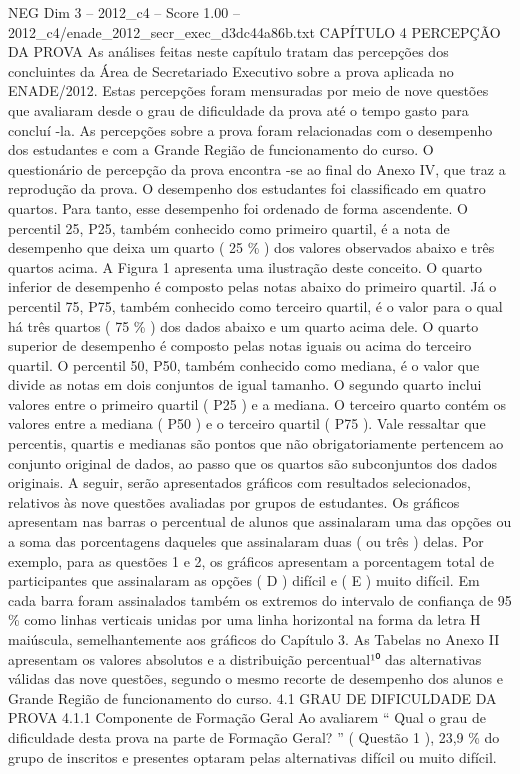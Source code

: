 \begin{textsample}{NEG Dim 3 – 2012\_c4 – Score 1.00 – 2012\_c4/enade\_2012\_secr\_exec\_d3dc44a86b.txt}  \label{ex:f3_neg_125}
CAPÍTULO 4 PERCEPÇÃO DA PROVA As análises feitas neste capítulo tratam das percepções dos concluintes da Área de Secretariado Executivo sobre a prova aplicada no ENADE/2012.
Estas percepções foram mensuradas por meio de nove questões que avaliaram desde o grau de dificuldade da prova até o tempo gasto para concluí -la.
As percepções sobre a prova foram relacionadas com o desempenho dos estudantes e com a Grande Região de funcionamento do curso.
O questionário de percepção da prova encontra -se ao final do Anexo IV, que traz a reprodução da prova.
O desempenho dos estudantes foi classificado em quatro quartos.
Para tanto, esse desempenho foi ordenado de forma ascendente.
O percentil 25, P25, também conhecido como primeiro quartil, é a nota de desempenho que deixa um quarto ( 25 \% ) dos valores observados abaixo e três quartos acima.
A Figura 1 apresenta uma ilustração deste conceito.
O quarto inferior de desempenho é composto pelas notas abaixo do primeiro quartil.
Já o percentil 75, P75, também conhecido como terceiro quartil, é o valor para o qual há três quartos ( 75 \% ) dos dados abaixo e um quarto acima dele.
O quarto superior de desempenho é composto pelas notas iguais ou acima do terceiro quartil.
O percentil 50, P50, também conhecido como mediana, é o valor que divide as notas em dois conjuntos de igual tamanho.
O segundo quarto inclui valores entre o primeiro quartil ( P25 ) e a mediana.
O terceiro quarto contém os valores entre a mediana ( P50 ) e o terceiro quartil ( P75 ).
Vale ressaltar que percentis, quartis e medianas são pontos que não obrigatoriamente pertencem ao conjunto original de dados, ao passo que os quartos são subconjuntos dos dados originais.
A seguir, serão apresentados gráficos com resultados selecionados, relativos às nove questões avaliadas por grupos de estudantes.
Os gráficos apresentam nas barras o percentual de alunos que assinalaram uma das opções ou a soma das porcentagens daqueles que assinalaram duas ( ou três ) delas.
Por exemplo, para as questões 1 e 2, os gráficos apresentam a porcentagem total de participantes que assinalaram as opções ( D ) difícil e ( E ) muito difícil.
Em cada barra foram assinalados também os extremos do intervalo de confiança de 95 \% como linhas verticais unidas por uma linha horizontal na forma da letra H maiúscula, semelhantemente aos gráficos do Capítulo 3.
As Tabelas no Anexo II apresentam os valores absolutos e a distribuição percentual¹⁰ das alternativas válidas das nove questões, segundo o mesmo recorte de desempenho dos alunos e Grande Região de funcionamento do curso. 4.1 GRAU DE DIFICULDADE DA PROVA 4.1.1 Componente de Formação Geral Ao avaliarem “ Qual o grau de dificuldade desta prova na parte de Formação Geral? ” ( Questão 1 ), 23,9 \% do grupo de inscritos e presentes optaram pelas alternativas difícil ou muito difícil.

\end{textsample}
